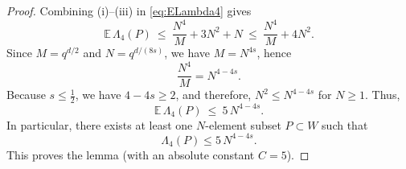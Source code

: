 \documentclass{article}
\begin{document}
\begin{proof}
Combining (i)–(iii) in \eqref{eq:ELambda4} gives
\[
\mathbb{E}\,\Lambda_4(P)\ \le\ \frac{N^4}{M}+3N^2+N
\ \le\ \frac{N^4}{M}+4N^2.
\]
Since $M=q^{d/2}$ and $N=q^{d/(8s)}$, we have $M=N^{4s}$, hence
\[
\frac{N^4}{M}=N^{4-4s}.
\]
Because $s\le \frac12$, we have $4-4s\ge 2$, and therefore, $N^2\le N^{4-4s}$ for $N\ge 1$.
Thus,
\[
\mathbb{E}\,\Lambda_4(P)\ \le\ 5\,N^{4-4s}.
\]
In particular, there exists at least one $N$-element subset $P\subset W$ such that
\[
\Lambda_4(P)\le 5\,N^{4-4s}.
\]
This proves the lemma (with an absolute constant $C=5$).
\end{proof}








\end{document}
